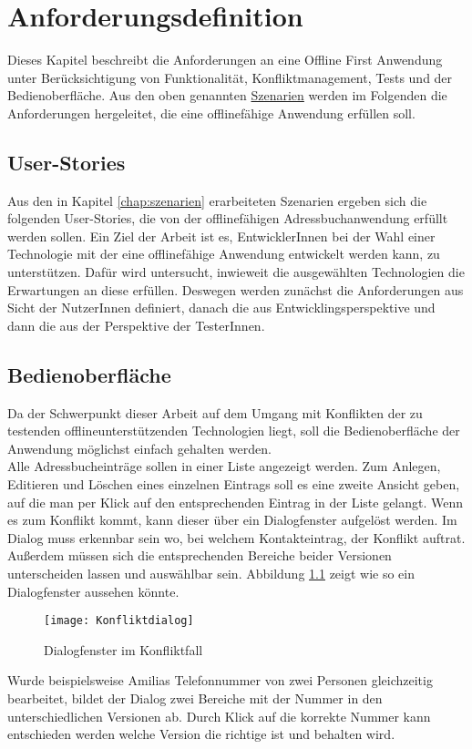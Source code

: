 \chapter{\label{chap:anforderungen}Anforderungsdefinition}
Dieses Kapitel beschreibt die Anforderungen an eine Offline First Anwendung unter Berücksichtigung von Funktionalität, Konfliktmanagement, Tests und der Bedienoberfläche.
Aus den oben genannten \hyperref[chap:szenarien]{Szenarien} werden im Folgenden die Anforderungen hergeleitet, die eine offlinefähige Anwendung erfüllen soll.
%
%

%
%
\section{User-Stories}
Aus den in Kapitel \ref{chap:szenarien} erarbeiteten Szenarien ergeben sich die folgenden User-Stories, die von der offlinefähigen Adressbuchanwendung erfüllt werden sollen.
Ein Ziel der Arbeit ist es, EntwicklerInnen bei der Wahl einer Technologie mit der eine offlinefähige Anwendung entwickelt werden kann, zu unterstützen. Dafür wird untersucht, inwieweit die ausgewählten Technologien die Erwartungen an diese erfüllen.
Deswegen werden zunächst die Anforderungen aus Sicht der NutzerInnen definiert, danach die aus Entwicklingsperspektive und dann die aus der Perspektive der TesterInnen.



%
%

%
%
\section{Bedienoberfläche}
Da der Schwerpunkt dieser Arbeit auf dem Umgang mit Konflikten der zu testenden offlineunterstützenden Technologien liegt, soll die Bedienoberfläche der Anwendung möglichst einfach gehalten werden.\\
Alle Adressbucheinträge sollen in einer Liste angezeigt werden. Zum Anlegen, Editieren und Löschen eines einzelnen Eintrags soll es eine zweite Ansicht geben, auf die man per Klick auf den entsprechenden Eintrag in der Liste gelangt.
Wenn es zum Konflikt kommt, kann dieser über ein Dialogfenster aufgelöst werden. Im Dialog muss erkennbar sein wo, bei welchem Kontakteintrag, der Konflikt auftrat.
Außerdem müssen sich die entsprechenden Bereiche beider Versionen unterscheiden lassen und auswählbar sein. Abbildung \ref{fig:dialog} zeigt wie so ein Dialogfenster aussehen könnte.
\begin{figure}[H]
	\centering
	\texttt{[image: Konfliktdialog]}
	\grayRule
	\caption{Dialogfenster im Konfliktfall}
	\label{fig:dialog}
\end{figure}
Wurde beispielsweise Amilias Telefonnummer von zwei Personen gleichzeitig bearbeitet, bildet der Dialog zwei Bereiche mit der Nummer in den unterschiedlichen Versionen ab.
Durch Klick auf die korrekte Nummer kann entschieden werden welche Version die richtige ist und behalten wird.
%
%
